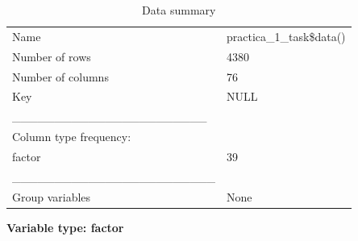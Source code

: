 \documentclass[
  11pt,
  a4paper,
]{article}
\begin{document}
\begin{longtable}[]{@{}ll@{}}
\caption{Data summary}\tabularnewline
\toprule()
\endhead
Name & practica\_1\_task\$data() \\
Number of rows & 4380 \\
Number of columns & 76 \\
Key & NULL \\
\_\_\_\_\_\_\_\_\_\_\_\_\_\_\_\_\_\_\_\_\_\_\_ & \\
Column type frequency: & \\
factor & 39 \\
\_\_\_\_\_\_\_\_\_\_\_\_\_\_\_\_\_\_\_\_\_\_\_\_ & \\
Group variables & None \\
\bottomrule()
\end{longtable}

\textbf{Variable type: factor}
\end{document}
